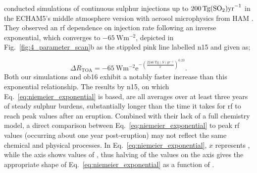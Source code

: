 \documentclass{ametsocV6.1}
\begin{document}

\citet{niemeier2015} conducted simulations of continuous sulphur injections up to
\(\SI{200}{\tera\gram(\ce{SO2})\mathrm{yr}^{-1}}\) in the ECHAM5's middle atmosphere
version \citep{giorgetta2006} with aerosol microphysics from HAM \citep{stier2005}. They
observed an \gls{rf} dependence on  injection rate following an inverse
exponential, which converges to \(\SI{-65}{\watt\meter^{-2}}\), depicted in
Fig.~\ref{fig:4_parameter_scan}b as the stippled pink line labelled \gls{n15} and given
as;

\begin{equation}
  \Delta
  R_{\mathrm{TOA}} =
  -\SI{65}{\watt\metre^{-2}}
  \mathrm{e}^{-{\left(\frac{\SI{2246}{\tera\gram(S)yr^{-1}}}{x}\right)}^{0.23}}.
  \label{eq:niemeier_exponential}
\end{equation}
%
Both our simulations and \gls{ob16} exhibit a notably faster increase than this
exponential relationship. The results by \gls{n15}, on which
Eq.~\ref{eq:niemeier_exponential} is based, are all averages over at least three years
of steady sulphur burdens, substantially longer than the time it takes for \gls{rf} to
reach peak values after an eruption. Combined with their lack of a full chemistry model,
a direct comparison between Eq.~\ref{eq:niemeier_exponential} to peak \gls{rf} values
(occurring about one year post-eruption) may not reflect the same chemical and physical
processes. In Eq.~\ref{eq:niemeier_exponential}, \(x\) represents , while the axis
shows values of , thus halving of the  values on the axis gives the
appropriate shape of Eq.~\ref{eq:niemeier_exponential} as a function of .
\end{document}
